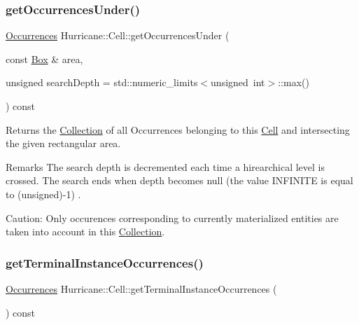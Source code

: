 \subsubsection{\texorpdfstring{get\+Occurrences\+Under()}{getOccurrencesUnder()}}
{\footnotesize\ttfamily \mbox{\hyperlink{namespaceHurricane_a1912927c128eee859af62dbe4cbe0a6b}{Occurrences}} Hurricane\+::\+Cell\+::get\+Occurrences\+Under (\begin{DoxyParamCaption}\item[{const \mbox{\hyperlink{classHurricane_1_1Box}{Box}} \&}]{area,  }\item[{unsigned}]{search\+Depth = {\ttfamily std\+:\+:numeric\+\_\+limits$<$unsigned~int$>$\+:\+:max()} }\end{DoxyParamCaption}) const}

Returns the \mbox{\hyperlink{classHurricane_1_1Collection}{Collection}} of all Occurrences belonging to this \mbox{\hyperlink{classHurricane_1_1Cell}{Cell}} and intersecting the given rectangular area.

\begin{DoxyRemark}{Remarks}
The search depth is decremented each time a hirearchical level is crossed. The search ends when depth becomes null (the value {\ttfamily I\+N\+F\+I\+N\+I\+TE} is equal to {\ttfamily }(unsigned)-\/1) .
\end{DoxyRemark}
\begin{DoxyParagraph}{Caution\+: Only occurences corresponding to currently materialized}
entities are taken into account in this \mbox{\hyperlink{classHurricane_1_1Collection}{Collection}}. 
\end{DoxyParagraph}
\mbox{\label{classHurricane_1_1Cell_a30b71d9a35ff4e0b59b98ef515f26fc0}} 
\subsubsection{\texorpdfstring{get\+Terminal\+Instance\+Occurrences()}{getTerminalInstanceOccurrences()}}
{\footnotesize\ttfamily \mbox{\hyperlink{namespaceHurricane_a1912927c128eee859af62dbe4cbe0a6b}{Occurrences}} Hurricane\+::\+Cell\+::get\+Terminal\+Instance\+Occurrences (\begin{DoxyParamCaption}{ }\end{DoxyParamCaption}) const}

